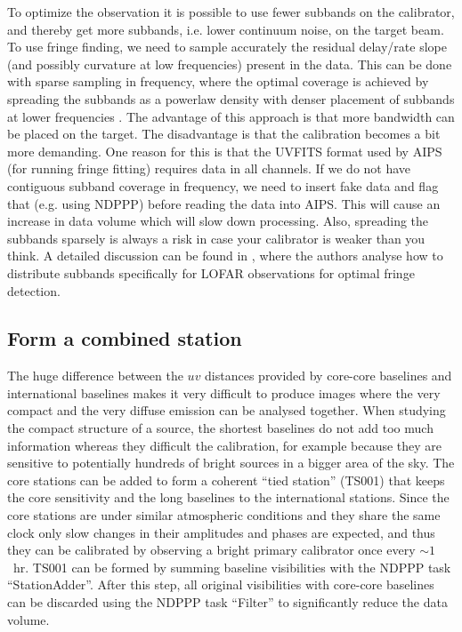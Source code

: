 \documentclass[graybox]{svmult}
\begin{document}
To optimize the observation it is possible to use fewer subbands on the
calibrator, and thereby get more subbands, i.e. lower continuum noise, on the
target beam. To use fringe finding, we need to sample accurately the residual
delay/rate slope (and possibly curvature at low frequencies) present in the
data. This can be done with sparse sampling in frequency, where the optimal
coverage is achieved by spreading the subbands as a powerlaw density with
denser placement of subbands at lower frequencies \citep{marti-vidal10}. The
advantage of this approach is that more bandwidth can be placed on the target.
The disadvantage is that the calibration becomes a bit more demanding. One
reason for this is that the UVFITS format used by AIPS (for running fringe
fitting) requires data in all channels.  If we do not have contiguous subband
coverage in frequency, we need to insert fake data and flag that (e.g. using
NDPPP) before reading the data into AIPS.  This will cause an increase in data
volume which will slow down processing.  Also, spreading the subbands sparsely
is always a risk in case your calibrator is weaker than you think. A detailed
discussion can be found in \cite{marti-vidal10}, where the authors analyse how
to distribute subbands specifically for LOFAR observations for optimal fringe
detection.

\subsection{Form a combined station}

The huge difference between the $uv$ distances provided by core-core baselines
and international baselines makes it very difficult to produce images where the
very compact and the very diffuse emission can be analysed together. When
studying the compact structure of a source, the shortest baselines do not add
too much information whereas they difficult the calibration, for example
because they are sensitive to potentially hundreds of bright sources in a
bigger area of the sky. The core stations can be added to form a coherent
``tied station'' (TS001) that keeps the core sensitivity and the long baselines
to the international stations.  Since the core stations are under similar
atmospheric conditions and they share the same clock only slow changes in their
amplitudes and phases are expected, and thus they can be calibrated by
observing a bright primary calibrator once every $\sim1$~hr. TS001 can be
formed by summing baseline visibilities with the NDPPP task ``StationAdder''.
After this step, all original visibilities with core-core baselines can be
discarded using the NDPPP task ``Filter'' to significantly reduce the data
volume.
\end{document}
